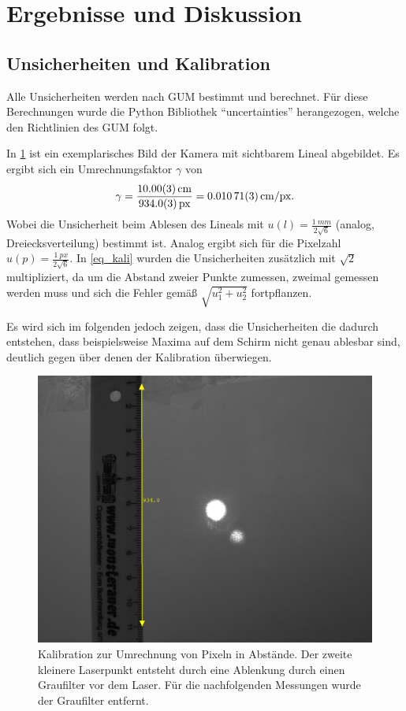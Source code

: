 \documentclass[
	a4paper,
	12pt,
	pagesize,
	ngerman
]{scrartcl}
\begin{document}
	\section{Ergebnisse und Diskussion}

	\subsection{Unsicherheiten und Kalibration}
	Alle Unsicherheiten werden nach GUM bestimmt und berechnet.
	Für diese Berechnungen wurde die Python Bibliothek \enquote{uncertainties} herangezogen, welche den Richtlinien des GUM folgt.

	In \cref{fig_kalibration} ist ein exemplarisches Bild der Kamera mit sichtbarem Lineal abgebildet.
	Es ergibt sich ein Umrechnungsfaktor $\gamma$ von
	\begin{equation}
			\label{eq_kali}
			\gamma = \frac{\SI{10.0+-0.03}{cm}}{\SI{934+-0.3}{px}}=\SI{0.01071+-0.00003}{cm/px}.
	\end{equation}
	Wobei die Unsicherheit beim Ablesen des Lineals mit $u(l)=\frac{\SI{1}{mm}}{2\sqrt{6}}$ (analog, Dreiecksverteilung) bestimmt ist.
	Analog ergibt sich für die Pixelzahl $u(p)=\frac{\SI{1}{px}}{2\sqrt{6}}$.
	In \cref{eq_kali} wurden die Unsicherheiten zusätzlich mit $\sqrt{2}$ multipliziert, da um die Abstand zweier Punkte zumessen, zweimal gemessen werden muss und sich die Fehler gemäß $\sqrt{u_1^2+u_2^2}$ fortpflanzen.

	Es wird sich im folgenden jedoch zeigen, dass die Unsicherheiten die dadurch entstehen, dass beispielsweise Maxima auf dem Schirm nicht genau ablesbar sind, deutlich gegen über denen der Kalibration überwiegen.


	\begin{figure}[H]
		\includegraphics[width=0.7\linewidth]{raw/0/0_kalibration.png}
					\caption{
						Kalibration zur Umrechnung von Pixeln in Abstände.
						Der zweite kleinere Laserpunkt entsteht durch eine Ablenkung durch einen Graufilter vor dem Laser.
						Für die nachfolgenden Messungen wurde der Graufilter entfernt.
					}
					\label{fig_kalibration}
			\end{figure}
\end{document}
